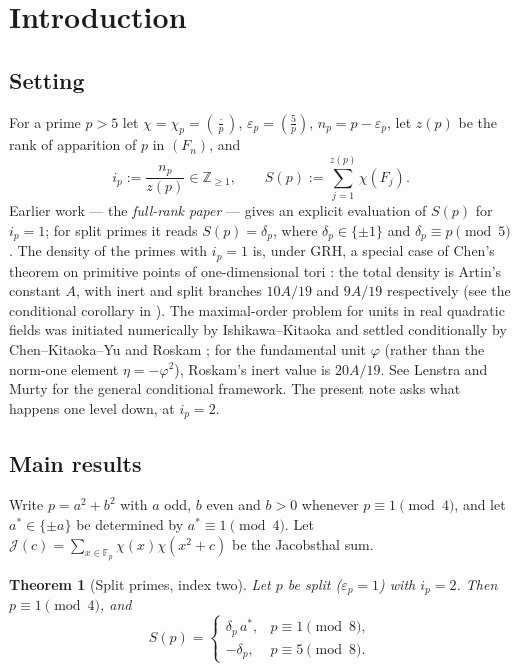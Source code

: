 \documentclass[11pt]{amsart}
\theoremstyle{plain}
\newtheorem{mainthm}{Theorem}
\theoremstyle{definition}
\newcommand{\Fp}{\mathbb{F}_p}
\newcommand{\leg}[2]{\left(\frac{#1}{#2}\right)}
\newcommand{\Jac}{\mathcal{J}}
\begin{document}
\maketitle

\section{Introduction}\label{sec:intro}

\subsection{Setting}
For a prime $p>5$ let $\chi=\chi_p=\leg{\cdot}{p}$, $\varepsilon_p=\leg5p$,
$n_p=p-\varepsilon_p$, let $z(p)$ be the rank of apparition of $p$ in $(F_n)$, and
\[
  i_p:=\frac{n_p}{z(p)}\in\mathbb Z_{\ge1},\qquad
  S(p):=\sum_{j=1}^{z(p)}\chi(F_j).
\]
Earlier work \cite{Ghandali2026Preprint} --- the \emph{full-rank paper} --- gives an
explicit evaluation of $S(p)$ for $i_p=1$; for split primes it reads
$S(p)=\delta_p$, where $\delta_p\in\{\pm1\}$ and
$\delta_p\equiv p\pmod 5$. The density of the primes with $i_p=1$ is,
under GRH, a special case of Chen's theorem on primitive points of
one-dimensional tori \cite{Chen2002}: the total density is Artin's
constant $A$, with inert and split branches $10A/19$ and $9A/19$
respectively (see the conditional corollary in \cite{Ghandali2026Preprint}). The
maximal-order problem for units in real quadratic fields was initiated
numerically by Ishikawa--Kitaoka \cite{IshikawaKitaoka1998} and settled
conditionally by Chen--Kitaoka--Yu \cite{ChenKitaokaYu2000} and Roskam
\cite{Roskam2000}; for the fundamental unit $\varphi$ (rather than the
norm-one element $\eta=-\varphi^2$), Roskam's inert value is
$20A/19$. See Lenstra \cite{Lenstra1977} and Murty \cite{Murty1983}
for the general conditional framework. The present note asks what
happens one level down, at $i_p=2$.

\subsection{Main results}
Write $p=a^2+b^2$ with $a$ odd, $b$ even and $b>0$ whenever $p\equiv1\pmod4$, and let
$a^{*}\in\{\pm a\}$ be determined by $a^{*}\equiv1\pmod4$. Let
$\Jac(c)=\sum_{x\in\Fp}\chi(x)\chi(x^2+c)$ be the Jacobsthal sum.

\begin{mainthm}[Split primes, index two]\label{thm:A}
Let $p$ be split ($\varepsilon_p=1$) with $i_p=2$. Then $p\equiv1\pmod4$, and
\[
  S(p)=\begin{cases}\delta_p\,a^{*}, & p\equiv1\pmod8,\\[2pt] -\delta_p, & p\equiv5\pmod8.\end{cases}
\]
\end{mainthm}
\end{document}
